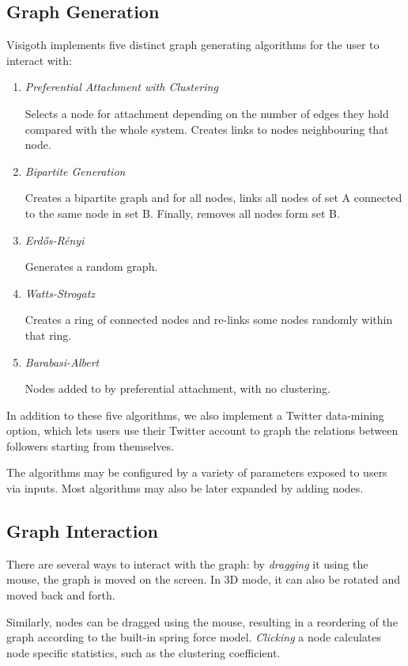 \documentclass[a4paper,11pt,titlepage]{article}
\begin{document}
\subsection{Graph Generation}
Visigoth implements five distinct graph generating algorithms for the user to interact with:
\begin{enumerate}
\item \emph{Preferential Attachment with Clustering}

Selects a node for attachment depending on the number of edges they hold 
compared with the whole system. Creates links to nodes neighbouring that node.

\item \emph{Bipartite Generation}

Creates a bipartite graph and for all nodes, links all nodes of set A connected to 
the same node in set B. Finally, removes all nodes form set B.

\item \emph{Erd\H{o}s-R\'{e}nyi}

Generates a random graph.

\item \emph{Watts-Strogatz}

Creates a ring of connected nodes and re-links some nodes randomly within that ring.

\item \emph{Barabasi-Albert}

Nodes added to by preferential attachment, with no clustering.

\end{enumerate}

In addition to these five algorithms, we also implement a Twitter data-mining option, 
which lets users use their Twitter account to graph the relations between followers 
starting from themselves.

The algorithms may be configured by a variety of parameters exposed to users 
via inputs. Most algorithms may also be later expanded by adding nodes.

\subsection{Graph Interaction}
There are several ways to interact with the graph: by \emph{dragging} it using the mouse,
 the graph is moved on the screen. In 3D mode, it can also be rotated and moved 
back and forth.

Similarly, nodes can be dragged using the mouse, resulting in a reordering of the 
graph according to the built-in spring force model. \emph{Clicking} a node calculates 
node specific statistics, such as the clustering coefficient.
\end{document}
